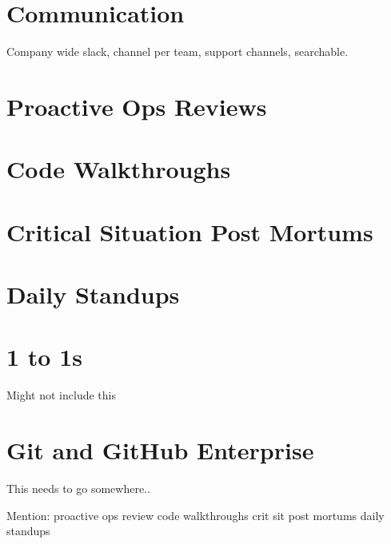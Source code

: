 \section{Communication}
Company wide slack, channel per team, support channels, searchable.

\section{Proactive Ops Reviews}

\section{Code Walkthroughs}

\section{Critical Situation Post Mortums}

\section{Daily Standups}

\section{1 to 1s}
Might not include this



\section{Git and GitHub Enterprise}
This needs to go somewhere..



 

Mention:
proactive ops review
code walkthroughs
crit sit post mortums
daily standups